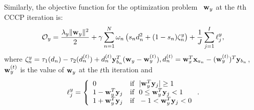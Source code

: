 

Similarly, the objective function for the optimization problem \wrt~${\bf w}_{y}$ at the $t$th \mbox{CCCP} iteration is:
\begin{align}
\mathcal{O}_{y}=\frac{\lambda_{y}\|{\bf w}_{y}\|^{2}}{2}+\gamma\sum\limits_{n=1}^{N}\omega_{n}\left(s_{n}d_{n}^{2}+(1-s_{n})\zeta^{y}_{n}\right) + \frac{1}{J}\sum\limits_{j=1}^{I}\ell_{j}^{y},
\label{eqn:objy}
\end{align}
where $\zeta^{y}_{n} = \tau_{1}(d_{n})-\tau_{2}(d_{n}^{(t)})+{d}^{(t)}_{n}{\bf y}_{b_n}^{T}({\bf w}_{y}-{\bf w}_{y}^{(t)}), {d}^{(t)}_{n} = {\bf w}_{x}^{T}{\bf x}_{a_n}-({\bf w}^{(t)}_{y})^{T}{\bf y}_{b_n}$, ${\bf w}_{y}^{(t)}$ is the value of ${\bf w}_{y}$ at the $t$th iteration and 
\begin{align}
\ell_{j}^{y}=\left\{ \begin{array}{ll}
         0 & \mbox{if ~}|\w_{y}^{T}\y_{j}| \ge 1 \\
         1- \w_{y}^{T}\y_{j} & \mbox{if ~}0\le\w_{y}^{T}\y_{j} < 1 \\
         1+\w_{y}^{T}\y_{j} & \mbox{if ~} -1 <\w_{y}^{T}\y_{j}<0\nonumber
                          \end{array} \right..
%
\end{align}


